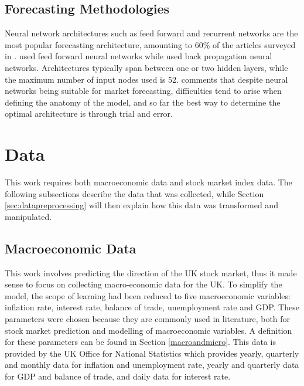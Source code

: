 \documentclass{UoYCSproject}
\begin{document}
\subsection{Forecasting Methodologies}
Neural network architectures such as feed forward and recurrent networks are the most popular forecasting architecture, amounting to 60\% of the articles surveyed in  \cite{atsalakis2009surveying}. \cite{ajith2003hybrid, andreou2000testing, pantazopoulos1998financial,phua2001neural, refenes1997neural, thawornwong2004adaptive} used feed forward neural networks while \cite{barnes2000study, leigh2002analysis, witkowska1995neural} used back propagation neural networks. Architectures typically span between one or two hidden layers, while the maximum number of input nodes used is 52. \cite{atsalakis2009surveying} comments that despite neural networks being suitable for market forecasting, difficulties tend to arise when defining the anatomy of the model, and so far the best way to determine the optimal architecture is through trial and error. 

\section{Data} 
\label{sec:data}
This work requires both macroeconomic data and stock market index data. The following subsections describe the data that was collected, while Section \ref{sec:datapreprocessing} will then explain how this data was transformed and manipulated.

\subsection{Macroeconomic Data}
This work involves predicting the direction of the UK stock market, thus it made sense to focus on collecting macro-economic data for the UK. To simplify the model, the scope of learning had been reduced to five macroeconomic variables: inflation rate, interest rate, balance of trade,  unemployment rate and GDP. These parameters were chosen because they are commonly used in literature, both for stock market prediction and modelling of macroeconomic variables. A definition for these parameters can be found in Section \ref{macroandmicro}. This data is provided by the UK Office for National Statistics which provides yearly, quarterly and monthly data for inflation and unemployment rate, yearly and quarterly data for GDP and balance of trade, and daily data for interest rate. 
\end{document}
